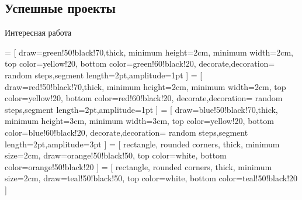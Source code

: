 \subsection{Успешные проекты}

\begin{frame}{Интересная работа}
    \begin{center}
         = [
            draw=green!50!black!70,thick,
            minimum height=2cm,
            minimum width=2cm,
            top color=yellow!20,
            bottom color=green!60!black!20,
            decorate,decoration={
                random steps,segment length=2pt,amplitude=1pt
            }
        ]
         = [
            draw=red!50!black!70,thick,
            minimum height=2cm,
            minimum width=2cm,
            top color=yellow!20,
            bottom color=red!60!black!20,
            decorate,decoration={
                random steps,segment length=2pt,amplitude=1pt
            }
        ]
         = [
            draw=blue!50!black!70,thick,
            minimum height=3cm,
            minimum width=3cm,
            top color=yellow!20,
            bottom color=blue!60!black!20,
            decorate,decoration={
                random steps,segment length=2pt,amplitude=3pt
            }
        ]
         = [
            rectangle, rounded corners,
            thick,
            minimum size=2cm,
            draw=orange!50!black!50,
            top color=white,
            bottom color=orange!50!black!20
        ]
         = [
            rectangle, rounded corners,
            thick,
            minimum size=2cm,
            draw=teal!50!black!50,
            top color=white,
            bottom color=teal!50!black!20
        ]
\end{center}
\end{frame}

